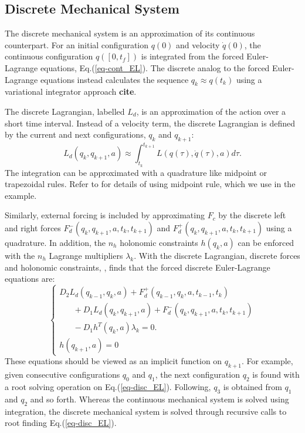 \documentclass[letterpaper, 10pt, conference]{ieeeconf}
\begin{document}
\subsection{Discrete Mechanical System}
The discrete mechanical system is an approximation of its continuous counterpart.  For an initial configuration $q(0)$ and velocity $\dot{q}(0)$, the continuous configuration $q([0,t_f])$ is integrated from the forced Euler-Lagrange equations, Eq.(\ref{eq-cont_EL}).  The discrete analog to the forced Euler-Lagrange equations instead calculates the sequence $q_k\approx q(t_k)$ using a variational integrator approach \textbf{cite}.  

The discrete Lagrangian, labelled $L_d$, is an approximation of the action over a short time interval.  Instead of a velocity term, the discrete Lagrangian is defined by the current and next configurations, $q_k$ and $q_{k+1}$:
\begin{equation}
L_d(q_k,q_{k+1},a) \approx \int_{t_k}^{t_{k+1}}L(q(\tau),\dot{q}(\tau),a)d\tau.
\label{eq-Ld}
\end{equation}
The integration can be approximated with a quadrature like midpoint or trapezoidal rules.  Refer to \cite{johnson_murphey_scalable} for details of using midpoint rule, which we use in the example.  

Similarly, external forcing is included by approximating $F_c$ by the discrete left and right forces $F_d^-(q_k,q_{k+1},a,t_k,t_{k+1})$ and $F_d^+(q_k,q_{k+1},a,t_k,t_{k+1})$ using a quadrature.  In addition, the $n_h$ holonomic constraints $h(q_k,a)$ can be enforced with the $n_h$ Lagrange multipliers $\lambda_k$.  With the discrete Lagrangian, discrete forces and holonomic constraints, \cite{johnson_murphey_scalable}, finds that the forced discrete Euler-Lagrange equations are:
\begin{equation}
\left\{\begin{array}{l}
D_2 L_d(q_{k-1},q_{k},a) + F_d^+(q_{k-1},q_{k},a,t_{k-1},t_{k}) \\\hspace{20pt}+ D_1L_d(q_k,q_{k+1},a) + F_d^-(q_k,q_{k+1},a,t_k,t_{k+1}) \\\hspace{20pt} - D_1h^T(q_k,a)\lambda_k= 0. \\
\hspace{0pt}h(q_{k+1},a) = 0
\end{array}
\right.
\label{eq-disc_EL}
\end{equation}
These equations should be viewed as an implicit function on $q_{k+1}$.  For example, given consecutive configurations $q_0$ and $q_1$, the next configuration $q_2$ is found with a root solving operation on Eq.(\ref{eq-disc_EL}). Following, $q_3$ is obtained from $q_1$ and $q_2$ and so forth.  Whereas the continuous mechanical system is solved using integration, the discrete mechanical system is solved through recursive calls to root finding Eq.(\ref{eq-disc_EL}). 
\end{document}
